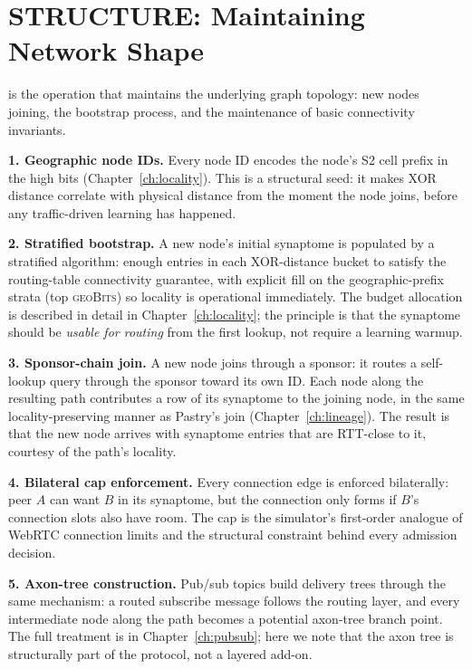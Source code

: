 \documentclass[twoside,nobib]{tufte-book}
\begin{document}
\section{STRUCTURE: Maintaining Network Shape}
\label{sec:structure}

 is the operation that maintains the
underlying graph topology: new nodes joining, the bootstrap
process, and the maintenance of basic connectivity invariants.

\textbf{1. Geographic node IDs.} Every node ID encodes the
node's S2 cell prefix in the high bits (Chapter~\ref{ch:locality}).
This is a structural seed: it makes XOR distance correlate with
physical distance from the moment the node joins, before any
traffic-driven learning has happened.

\textbf{2. Stratified bootstrap.} A new node's initial synaptome
is populated by a stratified algorithm: enough entries in each
XOR-distance bucket to satisfy the routing-table connectivity
guarantee, with explicit fill on the geographic-prefix strata
(top \textsc{geoBits}) so locality is operational immediately. The
budget allocation is described in detail in
Chapter~\ref{ch:locality}; the principle is that the synaptome
should be \emph{usable for routing} from the first lookup, not
require a learning warmup.

\textbf{3. Sponsor-chain join.} A new node joins through a
sponsor: it routes a self-lookup query through the sponsor toward
its own ID. Each node along the resulting path contributes a row
of its synaptome to the joining node, in the same locality-preserving
manner as Pastry's join (Chapter~\ref{ch:lineage}). The result is
that the new node arrives with synaptome entries that are
RTT-close to it, courtesy of the path's locality.

\textbf{4. Bilateral cap enforcement.} Every connection edge is
enforced bilaterally: peer $A$ can want $B$ in its synaptome, but
the connection only forms if $B$'s connection slots also have
room. The cap is the simulator's first-order analogue of WebRTC
connection limits and the structural constraint behind every
admission decision.

\textbf{5. Axon-tree construction.} Pub/sub topics build delivery
trees through the same mechanism: a routed subscribe message
follows the routing layer, and every intermediate node along the
path becomes a potential axon-tree branch point. The full
treatment is in Chapter~\ref{ch:pubsub}; here we note that the
axon tree is structurally part of the protocol, not a layered
add-on.
\end{document}
